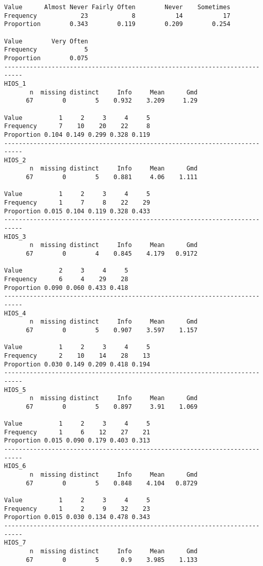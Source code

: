 \documentclass[]{article}
\begin{document}
\begin{verbatim}
Value      Almost Never Fairly Often        Never    Sometimes
Frequency            23            8           14           17
Proportion        0.343        0.119        0.209        0.254
                       
Value        Very Often
Frequency             5
Proportion        0.075
---------------------------------------------------------------------------
HIOS_1 
       n  missing distinct     Info     Mean      Gmd 
      67        0        5    0.932    3.209     1.29 
                                        
Value          1     2     3     4     5
Frequency      7    10    20    22     8
Proportion 0.104 0.149 0.299 0.328 0.119
---------------------------------------------------------------------------
HIOS_2 
       n  missing distinct     Info     Mean      Gmd 
      67        0        5    0.881     4.06    1.111 
                                        
Value          1     2     3     4     5
Frequency      1     7     8    22    29
Proportion 0.015 0.104 0.119 0.328 0.433
---------------------------------------------------------------------------
HIOS_3 
       n  missing distinct     Info     Mean      Gmd 
      67        0        4    0.845    4.179   0.9172 
                                  
Value          2     3     4     5
Frequency      6     4    29    28
Proportion 0.090 0.060 0.433 0.418
---------------------------------------------------------------------------
HIOS_4 
       n  missing distinct     Info     Mean      Gmd 
      67        0        5    0.907    3.597    1.157 
                                        
Value          1     2     3     4     5
Frequency      2    10    14    28    13
Proportion 0.030 0.149 0.209 0.418 0.194
---------------------------------------------------------------------------
HIOS_5 
       n  missing distinct     Info     Mean      Gmd 
      67        0        5    0.897     3.91    1.069 
                                        
Value          1     2     3     4     5
Frequency      1     6    12    27    21
Proportion 0.015 0.090 0.179 0.403 0.313
---------------------------------------------------------------------------
HIOS_6 
       n  missing distinct     Info     Mean      Gmd 
      67        0        5    0.848    4.104   0.8729 
                                        
Value          1     2     3     4     5
Frequency      1     2     9    32    23
Proportion 0.015 0.030 0.134 0.478 0.343
---------------------------------------------------------------------------
HIOS_7 
       n  missing distinct     Info     Mean      Gmd 
      67        0        5      0.9    3.985    1.133 
                                        

\end{verbatim}
\end{document}
